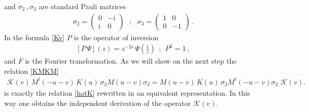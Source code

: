 \documentclass[11pt]{article}
\numberwithin{equation}{section}
\theoremstyle{plain}
\theoremstyle{definition}
\renewcommand{\imath}{\mathrm{i}}
\begin{document}
and $\sigma_2\,,\sigma_3$ are standard Pauli matrices
\begin{align}\label{sigma} 
	\sigma_2 = \left(\begin{array}{cc} 
		0 & -\imath \\
		\imath & 0\end{array}\right)\ \ \ ;\ \ \ 
	\sigma_3 = \left(\begin{array}{cc} 
		1 & 0 \\
		0 & -1\end{array}\right)\,.
\end{align}
In the formula \eqref{Kv} $P$ is the operator of inversion  
\begin{align}
	\left[P\,\Psi\right](z) = z^{-2s}\,\Psi\left(\frac{1}{z}\right) 
	\ \ ; \ \ P^2 = 1 \,,
\end{align}
and $F$ is the Fourier transformation.
As we will show on the next step the 
relation \eqref{KMKM} 
\begin{align*}
	\mathcal{K}(v) \, M^t(-u-v) \, K(u) \, \sigma_2 M(u - v) \sigma_2
	= M(u - v) \, K(u) \, \sigma_2 M^t(-u -v) \sigma_2 \; \mathcal{K}(v).
\end{align*}
is exactly the relation \eqref{hatK} rewritten in an equivalent 
representation. In this way one obtains the independent 
derivation of the operator $\mathcal{K}(v)$.
\end{document}
